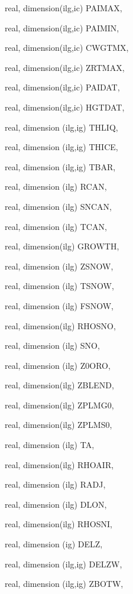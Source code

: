 {\begin{DoxyParamCaption}
\item[{real, dimension(ilg,ic)}]{P\+A\+I\+M\+A\+X, }
\item[{real, dimension(ilg,ic)}]{P\+A\+I\+M\+I\+N, }
\item[{real, dimension(ilg,ic)}]{C\+W\+G\+T\+M\+X, }
\item[{real, dimension(ilg,ic)}]{Z\+R\+T\+M\+A\+X, }
\item[{real, dimension(ilg,ic)}]{P\+A\+I\+D\+A\+T, }
\item[{real, dimension(ilg,ic)}]{H\+G\+T\+D\+A\+T, }
\item[{real, dimension (ilg,ig)}]{T\+H\+L\+I\+Q, }
\item[{real, dimension (ilg,ig)}]{T\+H\+I\+C\+E, }
\item[{real, dimension  (ilg,ig)}]{T\+B\+A\+R, }
\item[{real, dimension  (ilg)}]{R\+C\+A\+N, }
\item[{real, dimension (ilg)}]{S\+N\+C\+A\+N, }
\item[{real, dimension  (ilg)}]{T\+C\+A\+N, }
\item[{real, dimension(ilg)}]{G\+R\+O\+W\+T\+H, }
\item[{real, dimension (ilg)}]{Z\+S\+N\+O\+W, }
\item[{real, dimension (ilg)}]{T\+S\+N\+O\+W, }
\item[{real, dimension (ilg)}]{F\+S\+N\+O\+W, }
\item[{real, dimension(ilg)}]{R\+H\+O\+S\+N\+O, }
\item[{real, dimension   (ilg)}]{S\+N\+O, }
\item[{real, dimension (ilg)}]{Z0\+O\+R\+O, }
\item[{real, dimension(ilg)}]{Z\+B\+L\+E\+N\+D, }
\item[{real, dimension(ilg)}]{Z\+P\+L\+M\+G0, }
\item[{real, dimension(ilg)}]{Z\+P\+L\+M\+S0, }
\item[{real, dimension    (ilg)}]{T\+A, }
\item[{real, dimension(ilg)}]{R\+H\+O\+A\+I\+R, }
\item[{real, dimension  (ilg)}]{R\+A\+D\+J, }
\item[{real, dimension  (ilg)}]{D\+L\+O\+N, }
\item[{real, dimension(ilg)}]{R\+H\+O\+S\+N\+I, }
\item[{real, dimension  (ig)}]{D\+E\+L\+Z, }
\item[{real, dimension (ilg,ig)}]{D\+E\+L\+Z\+W, }
\item[{real, dimension (ilg,ig)}]{Z\+B\+O\+T\+W, }

\end{DoxyParamCaption}}
